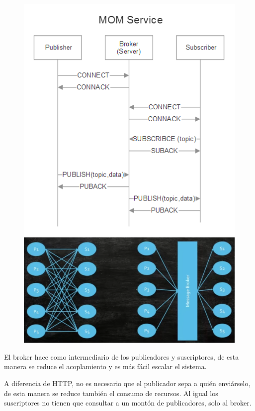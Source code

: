\documentclass[12pt, twoside, openright]{report} %
\begin{document}
\begin{figure}[H]
	{\includegraphics[scale=.5]{2021-04-08 09_17_44-2021-04-07 17-01-12.mkv.png}
		\includegraphics[scale=.22]{2021-04-08 09_20_09-2021-04-07 17-01-12.mkv.png}}
\end{figure}

El broker hace como intermediario de los publicadores y suscriptores, de esta manera se reduce el acoplamiento y es más fácil escalar el sistema.

A diferencia de HTTP, no es necesario que el publicador sepa a quién enviárselo, de esta manera se reduce también el consumo de recursos. Al igual los suscriptores no tienen que consultar a un montón de publicadores, solo al broker.
\end{document}
